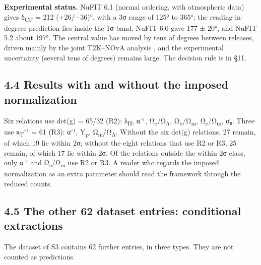 \documentclass[11pt,a4paper]{article}
\begin{document}
\textbf{Experimental status.} NuFIT 6.1 (normal ordering, with atmospheric data) gives δ\textsubscript{CP} = 212 (+26/−36)°, with a 3σ range of 125° to 365°; the reading-in-degrees prediction lies inside the 1σ band. NuFIT 6.0 gave 177 ± 20°, and NuFIT 5.2 about 197°. The central value has moved by tens of degrees between releases, driven mainly by the joint T2K--NOvA analysis \cite{26}, and the experimental uncertainty (several tens of degrees) remains large. The decision rule is in §11.

\subsection{4.4 Results with and without the imposed normalization}\label{results-with-and-without-the-imposed-normalization}

Six relations use det(g) = 65/32 (R2): λ\textsubscript{H}, α⁻¹, Ω\textsubscript{c}/Ω\textsubscript{Λ}, Ω\textsubscript{b}/Ω\textsubscript{m}, Ω\textsubscript{c}/Ω\textsubscript{m}, σ₈. Three use κ\textsubscript{T}⁻¹ = 61 (R3): α⁻¹, Y\textsubscript{p}, Ω\textsubscript{m}/Ω\textsubscript{Λ}. Without the six det(g) relations, 27 remain, of which 19 lie within 2σ; without the eight relations that use R2 or R3, 25 remain, of which 17 lie within 2σ. Of the relations outside the within-2σ class, only α⁻¹ and Ω\textsubscript{c}/Ω\textsubscript{m} use R2 or R3. A reader who regards the imposed normalization as an extra parameter should read the framework through the reduced counts.

\subsection{4.5 The other 62 dataset entries: conditional extractions}\label{the-other-62-dataset-entries-conditional-extractions}

The dataset of S3 contains 62 further entries, in three types. They are not counted as predictions.
\end{document}
